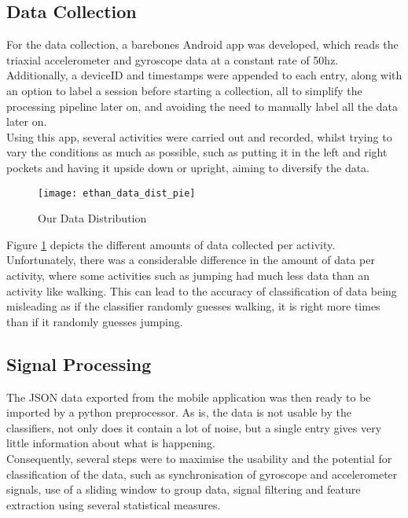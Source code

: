 \subsection{Data Collection}
For the data collection, a barebones Android app was developed, which reads the triaxial accelerometer and gyroscope data at a constant rate of 50hz.
Additionally, a deviceID and timestamps were appended to each entry, along with an option to label a session before starting a collection, all to simplify the processing pipeline later on,
and avoiding the need to manually label all the data later on.\\
Using this app, several activities were carried out and recorded, whilst trying to vary the conditions as much as possible, such as putting it in the left and right pockets and having it upside down or upright, aiming to diversify the data.  

\begin{figure}[htp]
    \centering
    \texttt{[image: ethan\_data\_dist\_pie]}
    \caption{Our Data Distribution}
    \label{our_data_count_dist}
    \end{figure}

Figure \ref{our_data_count_dist} depicts the different amounts of data collected per activity. Unfortunately, there was a considerable difference in the amount of data per activity, where some activities such as jumping had much less data than an activity like walking. This can lead to the accuracy of classification of data being misleading as if the classifier randomly guesses walking, it is right more times than if it randomly guesses jumping. 

\subsection{Signal Processing}
The JSON data exported from the mobile application was then ready to be imported by a python preprocessor. As is, the data is not usable by the classifiers, not only does it contain a lot of noise, but a single entry gives very little information about what is happening.\\
Consequently, several steps were to maximise the usability and the potential for classification of the data, such as synchronisation of gyroscope and accelerometer signals, use of a sliding window to group data, signal filtering and feature extraction using several statistical measures.   


